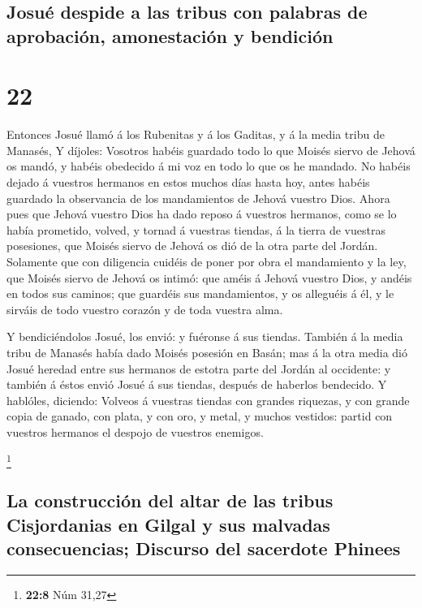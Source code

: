 \hypertarget{josuuxe9-despide-a-las-tribus-con-palabras-de-aprobaciuxf3n-amonestaciuxf3n-y-bendiciuxf3n}{%
\subsection{Josué despide a las tribus con palabras de aprobación,
amonestación y
bendición}\label{josuuxe9-despide-a-las-tribus-con-palabras-de-aprobaciuxf3n-amonestaciuxf3n-y-bendiciuxf3n}}

\hypertarget{section-21}{%
\section{22}\label{section-21}}

 Entonces Josué llamó á los Rubenitas y á los Gaditas, y á
la media tribu de Manasés,  Y díjoles: Vosotros habéis
guardado todo lo que Moisés siervo de Jehová os mandó, y habéis
obedecido á mi voz en todo lo que os he mandado.  No
habéis dejado á vuestros hermanos en estos muchos días hasta hoy, antes
habéis guardado la observancia de los mandamientos de Jehová vuestro
Dios.  Ahora pues que Jehová vuestro Dios ha dado reposo á
vuestros hermanos, como se lo había prometido, volved, y tornad á
vuestras tiendas, á la tierra de vuestras posesiones, que Moisés siervo
de Jehová os dió de la otra parte del Jordán.  Solamente
que con diligencia cuidéis de poner por obra el mandamiento y la ley,
que Moisés siervo de Jehová os intimó: que améis á Jehová vuestro Dios,
y andéis en todos sus caminos; que guardéis sus mandamientos, y os
alleguéis á él, y le sirváis de todo vuestro corazón y de toda vuestra
alma.

 Y bendiciéndolos Josué, los envió: y fuéronse á sus
tiendas.  También á la media tribu de Manasés había dado
Moisés posesión en Basán; mas á la otra media dió Josué heredad entre
sus hermanos de estotra parte del Jordán al occidente: y también á éstos
envió Josué á sus tiendas, después de haberlos bendecido. 
Y hablóles, diciendo: Volveos á vuestras tiendas con grandes riquezas, y
con grande copia de ganado, con plata, y con oro, y metal, y muchos
vestidos: partid con vuestros hermanos el despojo de vuestros enemigos.

\footnote{\textbf{22:8} Núm 31,27}

\hypertarget{la-construcciuxf3n-del-altar-de-las-tribus-cisjordanias-en-gilgal-y-sus-malvadas-consecuencias-discurso-del-sacerdote-phinees}{%
\subsection{La construcción del altar de las tribus Cisjordanias en
Gilgal y sus malvadas consecuencias; Discurso del sacerdote
Phinees}\label{la-construcciuxf3n-del-altar-de-las-tribus-cisjordanias-en-gilgal-y-sus-malvadas-consecuencias-discurso-del-sacerdote-phinees}}

